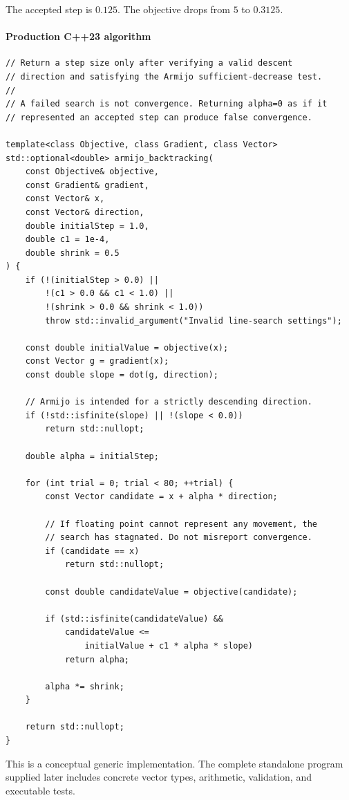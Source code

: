 The accepted step is \(0.125\). The objective drops from \(5\) to \(0.3125\).

\paragraph{Production C++23 algorithm}\label{02-foundations-ii-ch026-production-c23-algorithm}

\begin{verbatim}
// Return a step size only after verifying a valid descent
// direction and satisfying the Armijo sufficient-decrease test.
//
// A failed search is not convergence. Returning alpha=0 as if it
// represented an accepted step can produce false convergence.

template<class Objective, class Gradient, class Vector>
std::optional<double> armijo_backtracking(
    const Objective& objective,
    const Gradient& gradient,
    const Vector& x,
    const Vector& direction,
    double initialStep = 1.0,
    double c1 = 1e-4,
    double shrink = 0.5
) {
    if (!(initialStep > 0.0) ||
        !(c1 > 0.0 && c1 < 1.0) ||
        !(shrink > 0.0 && shrink < 1.0))
        throw std::invalid_argument("Invalid line-search settings");

    const double initialValue = objective(x);
    const Vector g = gradient(x);
    const double slope = dot(g, direction);

    // Armijo is intended for a strictly descending direction.
    if (!std::isfinite(slope) || !(slope < 0.0))
        return std::nullopt;

    double alpha = initialStep;

    for (int trial = 0; trial < 80; ++trial) {
        const Vector candidate = x + alpha * direction;

        // If floating point cannot represent any movement, the
        // search has stagnated. Do not misreport convergence.
        if (candidate == x)
            return std::nullopt;

        const double candidateValue = objective(candidate);

        if (std::isfinite(candidateValue) &&
            candidateValue <=
                initialValue + c1 * alpha * slope)
            return alpha;

        alpha *= shrink;
    }

    return std::nullopt;
}
\end{verbatim}

This is a conceptual generic implementation. The complete standalone program supplied later includes concrete vector types, arithmetic, validation, and executable tests.

